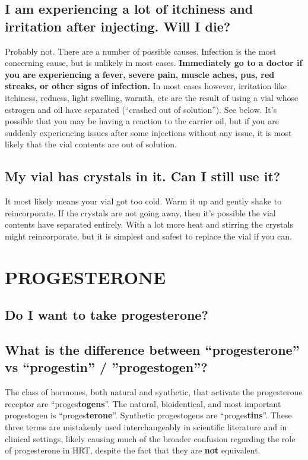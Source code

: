 \documentclass{article}
\begin{document}
\subsection{I am experiencing a lot of itchiness and irritation after injecting. Will I die?}

Probably not. There are a number of possible causes. Infection is the most concerning cause, but is unlikely in most cases. \textbf{Immediately go to a doctor if you are experiencing a fever, severe pain, muscle aches, pus, red streaks, or other signs of infection. }In most cases however, irritation like itchiness, redness, light swelling, warmth, etc are the result of using a vial whose estrogen and oil have separated (“crashed out of solution”). See below. It’s possible that you may be having a reaction to the carrier oil, but if you are suddenly experiencing issues after some injections without any issue, it is most likely that the vial contents are out of solution.

\subsection{My vial has crystals in it. Can I still use it?}

It most likely means your vial got too cold. Warm it up and gently shake to reincorporate. If the crystals are not going away, then it’s possible the vial contents have separated entirely. With a lot more heat and stirring the crystals might reincorporate, but it is simplest and safest to replace the vial if you can.

 

\section{PROGESTERONE}

\subsection{Do I want to take progesterone?}


\subsection{What is the difference between “progesterone” vs “progestin” / ”progestogen”?}

The class of hormones, both natural and synthetic, that activate the progesterone receptor are “proges\textbf{togens}”. The natural, bioidentical, and most important progestogen is “proges\textbf{terone}”. Synthetic progestogens are “proges\textbf{tins}”. These three terms are mistakenly used interchangeably in scientific literature and in clinical settings, likely causing much of the broader confusion regarding the role of progesterone in HRT, despite the fact that they are \textbf{not }equivalent.
\end{document}
